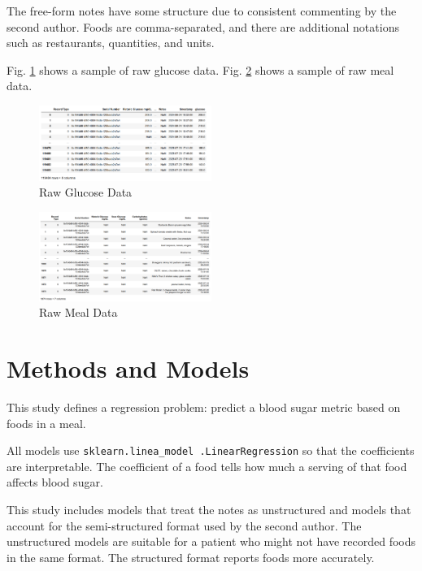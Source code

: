 \documentclass[conference]{IEEEtran}
\begin{document}
The free-form notes have some structure due to consistent commenting by the second author. Foods are comma-separated, and there are additional notations such as restaurants, quantities, and units.

Fig. \ref{fig:glucose_data} shows a sample of raw glucose data.  Fig. \ref{fig:meal_data} shows a sample of raw meal data.

\begin{figure}[tbp]
    \includegraphics[width=0.5\textwidth]{images/glucose_data.png}
    \caption{Raw Glucose Data}    \label{fig:glucose_data}
\end{figure}

\begin{figure}[htbp]
    \includegraphics[width=0.5\textwidth]{images/meal_data.png}
    \caption{Raw Meal Data}
    \label{fig:meal_data}
\end{figure}

\section{Methods and Models}

This study defines a regression problem: predict a blood sugar metric based on foods in a meal.

All models use \texttt{sklearn.linea\_model
.LinearRegression} so that the coefficients are interpretable. The coefficient of a food tells how much a serving of that food affects blood sugar.

This study includes models that treat the notes as unstructured and models that account for the semi-structured format used by the second author. The unstructured models are suitable for a patient who might not have recorded foods in the same format. The structured format reports foods more accurately.
\end{document}
